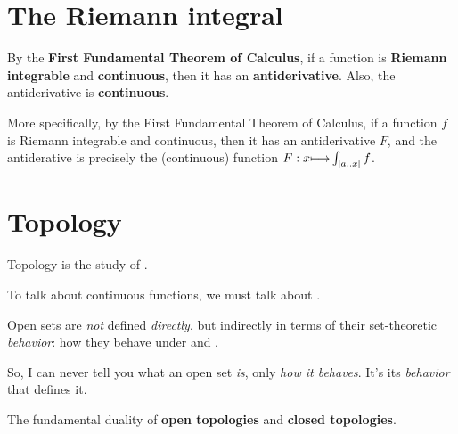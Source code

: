 \chapter{The Riemann integral}

\vs
By the {\bf First Fundamental Theorem of Calculus}, if a function is {\bf Riemann integrable} and {\bf continuous},
then it has an {\bf antiderivative}. Also, the antiderivative is {\bf continuous}.

\vs
More specifically, by the First Fundamental Theorem of Calculus,
if a function $f$ is Riemann integrable and continuous,
then it has an antiderivative $F$, and the antiderative is precisely the (continuous) function $F: x \mapsto \int_{\a[a..x\a]} f$.




\chapter{Topology}

\vs
Topology is the study of . \par
To talk about continuous functions, we must talk about . \par
Open sets are {\it not} defined {\it directly}, but indirectly in terms of their set-theoretic {\it behavior}: how they behave under  and . \par
So, I can never tell you what an open set {\it is}, only {\it how it behaves}. It's its {\it behavior} that defines it. \par

\vs
\theorem The fundamental duality of {\bf open topologies} and {\bf closed topologies}. \par

